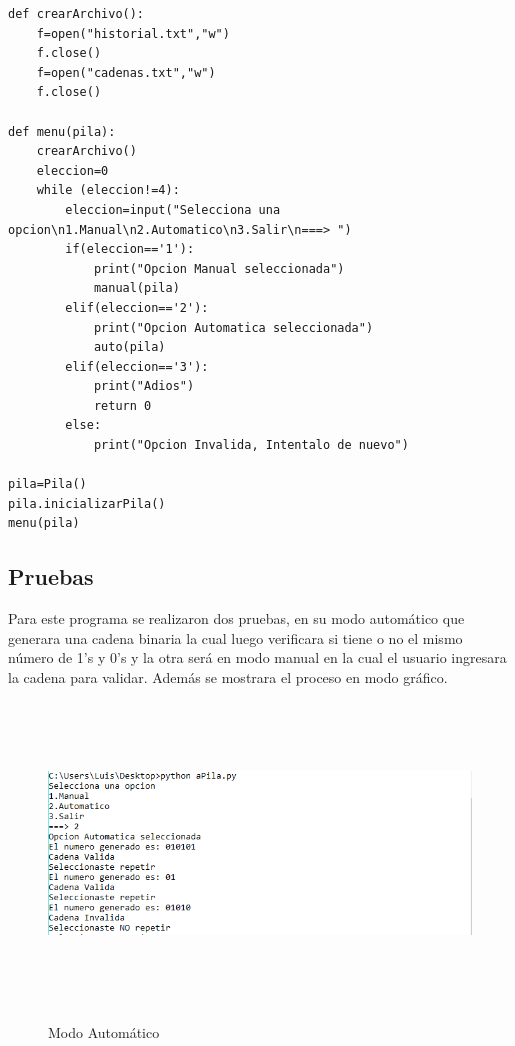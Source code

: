 \documentclass[12pt]{article}
\begin{document}
\begin{lstlisting}[frame=single]
def crearArchivo():
	f=open("historial.txt","w")
	f.close()
	f=open("cadenas.txt","w")
	f.close()

def menu(pila):
	crearArchivo()
	eleccion=0
	while (eleccion!=4):
		eleccion=input("Selecciona una opcion\n1.Manual\n2.Automatico\n3.Salir\n===> ")
		if(eleccion=='1'):
			print("Opcion Manual seleccionada")
			manual(pila)
		elif(eleccion=='2'):
			print("Opcion Automatica seleccionada")
			auto(pila)
		elif(eleccion=='3'):
			print("Adios")
			return 0
		else:
			print("Opcion Invalida, Intentalo de nuevo")

pila=Pila()
pila.inicializarPila()
menu(pila)

\end{lstlisting}

\subsection{Pruebas}

Para este programa se realizaron dos pruebas, en su modo automático que generara una cadena binaria la cual luego verificara si tiene o no el mismo número de 1’s y 0’s y la otra será en modo manual en la cual el usuario ingresara la cadena para validar. Además se mostrara el proceso en modo gráfico.\\

\begin{figure}[H]
\begin{center}
\includegraphics[width=\textwidth, height=8cm]{auto_pila}
\label{ }
\caption{Modo Automático}
\end{center}
\end{figure}
\end{document}

